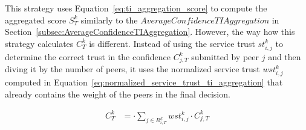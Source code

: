 This strategy uses Equation~\ref{eq:ti_aggregation_score} to compute the aggregated score $S^{k}_{T}$ similarly to the $AverageConfidenceTIAggregation$ in Section~\ref{subsec:AverageConfidenceTIAggregation}.
However, the way how this strategy calculates $C^{k}_{T}$ is different. 
Instead of using the service trust $st^{k}_{i, j}$ to determine the correct trust in the confidence $C^{k}_{j, T}$ submitted by peer $j$ and then diving it by the number of peers, it uses the normalized service trust $wst^{k}_{i,j}$ computed in Equation~\ref{eq:normalized_service_trust_ti_aggregation} that already contains the weight of the peers in the final decision.

\begin{equation}
\begin{split}
    C^{k}_{T} &= \cdot \sum_{{j}\in R^{k}_{i, T}} wst^{k}_{i,j} \cdot C^{k}_{j, T}
\end{split}
\end{equation}